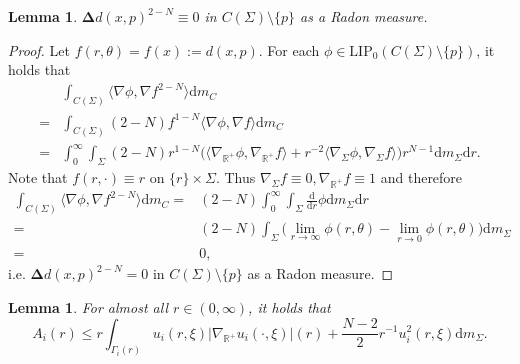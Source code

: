 \documentclass{article}
\newtheorem{lemma}[theorem]{Lemma}
\theoremstyle{remark}
\numberwithin{equation}{section}
\theoremstyle{definition}
\begin{document}
    \begin{lemma}\label{lemma_3_proof_of_main_theorem}
    	$\mathbf{\Delta} d(x,p)^{2-N} \equiv 0$ in $C(\Sigma) \setminus \{p\}$ as a Radon measure.
    \end{lemma}
    \begin{proof}
    	Let $f(r,\theta) = f(x):=d(x,p)$. For each $\phi \in \mathrm{LIP}_{0}(C(\Sigma)\setminus\{p\})$, it holds that
    	\begin{equation}
    		\begin{split}
    			&\int_{C(\Sigma)} \langle \nabla \phi ,\nabla f^{2-N} \rangle \mathrm{d}m_{C}\\
    			= & \int_{C(\Sigma)} (2-N)f^{1-N} \langle \nabla \phi ,\nabla f \rangle \mathrm{d}m_{C}\\
    			= & \int_{0}^{\infty} \int_{\Sigma} (2-N)r^{1-N} \Big( \langle \nabla_{\mathbb{R}^{+}} \phi, \nabla_{\mathbb{R}^{+}} f \rangle + r^{-2}\langle \nabla_{\Sigma} \phi, \nabla_{\Sigma} f \rangle \Big) r^{N-1} \mathrm{d}m_{\Sigma}\mathrm{d}r.
    		\end{split}
    	\end{equation}
    	Note that $f (r,\cdot) \equiv r$ on $\{r\} \times \Sigma$. Thus $\nabla_{\Sigma} f \equiv 0, \nabla_{\mathbb{R}^{+}} f \equiv 1$ and therefore
    	\begin{equation}
    		\begin{split}
    			\int_{C(\Sigma)} \langle \nabla \phi, \nabla f^{2-N}\rangle \mathrm{d}m_{C} =& (2-N) \int_{0}^{\infty} \int_{\Sigma} \frac{\mathrm{d}}{\mathrm{d}r} \phi \mathrm{d}m_{\Sigma}\mathrm{d}r\\
    			= & (2-N)\int_{\Sigma} \Big(\lim_{r \to \infty} \phi (r,\theta) - \lim_{r\to 0} \phi(r,\theta) \Big) \mathrm{d}m_{\Sigma}\\
    			= & 0,
    		\end{split}
    	\end{equation}
    	i.e. $\mathbf{\Delta} d(x,p)^{2-N} = 0$ in $C(\Sigma) \setminus \{p\}$ as a Radon measure.
    \end{proof}
    \begin{lemma}\label{lemma_4_proof_of_main_theorem}
    	For almost all $r \in (0,\infty)$, it holds that
    	\begin{equation} 
    		A_{i}(r) \le r \int_{\Gamma_{i}(r)} u_{i}(r,\xi) \lvert \nabla_{\mathbb{R}^{+}} u_{i}(\cdot,\xi) \rvert(r) + \frac{N-2}{2}r^{-1}u_{i}^{2}(r,\xi) \mathrm{d}m_{\Sigma}.
    	\end{equation}
    \end{lemma}
\end{document}
